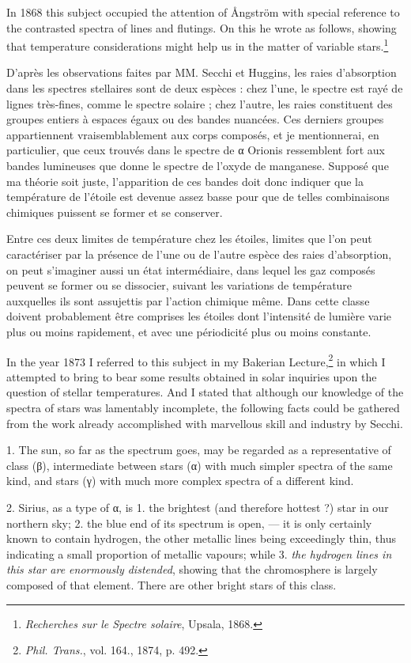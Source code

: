 \documentclass[a4paper, 12pt, oneside, polutonikogreek, english]{article}
\begin{document}
In 1868 this subject occupied the attention of Ångström with special reference to the contrasted spectra of lines and flutings. On this he wrote as follows, showing that temperature considerations might help us in the matter of variable stars.\footnote{\emph{Recherches sur le Spectre solaire}, Upsala, 1868.}

D'après les observations faites par MM. Secchi et Huggins, les raies d'absorption dans les spectres stellaires sont de deux espèces : chez l'une, le spectre est rayé de lignes très-fines, comme le spectre solaire ; chez l'autre, les raies constituent des groupes entiers à espaces égaux ou des bandes nuancées. Ces derniers groupes appartiennent vraisemblablement aux corps composés, et je mentionnerai, en particulier, que ceux trouvés dans le spectre de α Orionis ressemblent fort aux bandes lumineuses que donne le spectre de l'oxyde de manganese. Supposé que ma théorie soit juste, l'apparition de ces bandes doit donc indiquer que la température de l'étoile est devenue assez basse pour que de telles combinaisons chimiques puissent se former et se conserver.

Entre ces deux limites de température chez les étoiles, limites que l'on peut caractériser par la présence de l'une ou de l'autre espèce des raies d'absorption, on peut s'imaginer aussi un état intermédiaire, dans lequel les gaz composés peuvent se former ou se dissocier, suivant les variations de température auxquelles ils sont assujettis par l'action chimique même. Dans cette classe doivent probablement être comprises les étoiles dont l'intensité de lumière varie plus ou moins rapidement, et avec une périodicité plus ou moins constante.

In the year 1873 I referred to this subject in my Bakerian Lecture,\footnote{\emph{Phil. Trans.}, vol. 164., 1874, p. 492.} in which I attempted to bring to bear some results obtained in solar inquiries upon the question of stellar temperatures. And I stated that although our knowledge of the spectra of stars was lamentably incomplete, the following facts could be gathered from the work already accomplished with marvellous skill and industry by Secchi.

1. The sun, so far as the spectrum goes, may be regarded as a representative of class (β), intermediate between stars (α) with much simpler spectra of the same kind, and stars (γ) with much more complex spectra of a different kind.

2. Sirius, as a type of α, is 1. the brightest (and therefore hottest ?) star in our northern sky; 2. the blue end of its spectrum is open, --- it is only certainly known to contain hydrogen, the other metallic lines being exceedingly thin, thus indicating a small proportion of metallic vapours; while 3. \emph{the hydrogen lines in this star are enormously distended}, showing that the chromosphere is largely composed of that element. There are other bright stars of this class.
\end{document}
